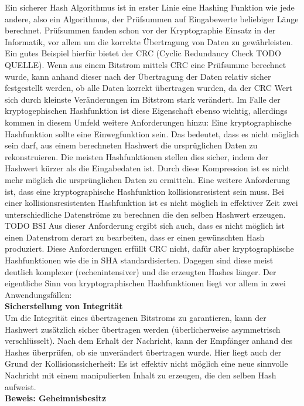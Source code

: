\documentclass[12pt,a4paper,bibliography=totocnumbered,listof=totocnumbered]{scrartcl}
\begin{document}
Ein sicherer Hash Algorithmus ist in erster Linie eine Hashing Funktion wie jede andere, also ein Algorithmus, der Prüfsummen auf Eingabewerte beliebiger Länge berechnet. Prüfsummen fanden schon vor der Kryptographie Einsatz in der Informatik, vor allem um die korrekte Übertragung von Daten zu gewährleisten. Ein gutes Beispiel hierfür bietet der CRC (Cyclic Redundancy Check TODO QUELLE). Wenn aus einem Bitstrom mittels CRC eine Prüfsumme berechnet wurde, kann anhand dieser nach der Übertragung der Daten relativ sicher festgestellt werden, ob alle Daten korrekt übertragen wurden, da der CRC Wert sich durch kleinste Veränderungen im Bitstrom stark verändert. Im Falle der kryptogephischen Hashfunktion ist diese Eigenschaft ebenso wichtig, allerdings kommen  in diesem Umfeld weitere Anforderungen hinzu: Eine kryptographische Hashfunktion sollte eine Einwegfunktion sein. Das bedeutet, dass es nicht möglich sein darf, aus einem berechneten Hashwert die ursprüglichen Daten zu rekonstruieren. Die meisten Hashfunktionen stellen dies sicher, indem der Hashwert kürzer als die Eingabedaten ist. Durch diese Kompression ist es nicht mehr möglich die ursprünglichen Daten zu ermitteln. Eine weitere Anforderung ist, dass eine kryptographische Hashfunktion kollisionsresistent sein muss. Bei einer kollisionsresistenten Hashfunktion ist es nicht möglich in effektiver Zeit zwei unterschiedliche Datenströme zu berechnen die den selben Hashwert erzeugen. TODO BSI \cite{12} Aus dieser Anforderung ergibt sich auch, dass es nicht möglich ist einen Datenstrom derart zu bearbeiten, dass er einen gewünschten Hash produziert. Diese Anforderungen erfüllt CRC nicht, dafür aber kryptographische Hashfunktionen wie die in SHA standardisierten. Dagegen sind diese meist deutlich komplexer (rechenintensiver) und die erzeugten Hashes länger. Der eigentliche Sinn von kryptographischen Hashfunktionen liegt vor allem in zwei Anwendungsfällen:
\\\textbf{Sicherstellung von Integrität}\\
Um die Integrität eines übertragenen Bitstroms zu garantieren, kann der Hashwert zusätzlich sicher übertragen werden (überlicherweise asymmetrisch verschlüsselt). Nach dem Erhalt der Nachricht, kann der Empfänger anhand des Hashes überprüfen, ob sie unverändert übertragen wurde. Hier liegt auch der Grund der Kollisionssicherheit: Es ist effektiv nicht möglich eine neue sinnvolle Nachricht mit einem manipulierten Inhalt zu erzeugen, die den selben Hash aufweist.
\\\textbf{Beweis: Geheimnisbesitz}\\
\end{document}
